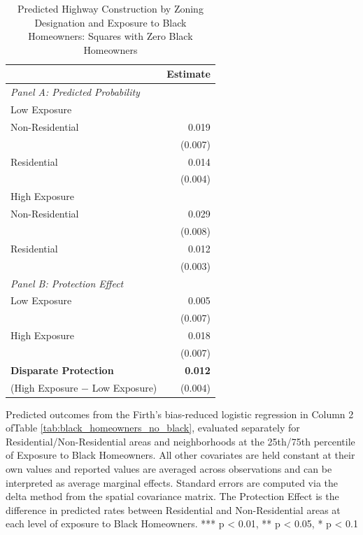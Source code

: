 \begin{table}[h]
\centering
\caption{Predicted Highway Construction by Zoning Designation and Exposure to Black Homeowners: Squares with Zero Black Homeowners}
\label{tab:results/predicted_outcomes_black_homeowners_no_black}
\begin{threeparttable}
\begin{tabular}{lr@{\hspace{1.2em}}}
\toprule
 & Estimate \\
\midrule
\textit{Panel A: Predicted Probability} & \\
\addlinespace[2pt]
Low Exposure & \\
\quad Non-Residential & 0.019 \\
 & (0.007) \\[4pt]
\quad Residential & 0.014 \\
 & (0.004) \\[4pt]
High Exposure & \\
\quad Non-Residential & 0.029 \\
 & (0.008) \\[4pt]
\quad Residential & 0.012 \\
 & (0.003) \\[4pt]
\midrule
\textit{Panel B: Protection Effect} & \\
\addlinespace[2pt]
Low Exposure & 0.005 \\
 & (0.007) \\[4pt]
High Exposure & 0.018\rlap{$^{**}$} \\
 & (0.007) \\[4pt]
\addlinespace[2pt]
\textbf{Disparate Protection} & \textbf{0.012}\rlap{$^{***}$} \\
(High Exposure $-$ Low Exposure) & (0.004) \\
\bottomrule
\end{tabular}
\begin{tablenotes}[flushleft]
\footnotesize
\item Predicted outcomes from the Firth's bias-reduced logistic regression in Column 2 ofTable \ref{tab:black_homeowners_no_black}, evaluated separately for Residential/Non-Residential areas and neighborhoods at the 25th/75th percentile of Exposure to Black Homeowners. All other covariates are held constant at their own values and reported values are averaged across observations and can be interpreted as average marginal effects. Standard errors are computed via the delta method from the spatial covariance matrix. The Protection Effect is the difference in predicted rates between Residential and Non-Residential areas at each level of exposure to Black Homeowners. *** p < 0.01, ** p < 0.05, * p < 0.1
\end{tablenotes}
\end{threeparttable}
\end{table}
